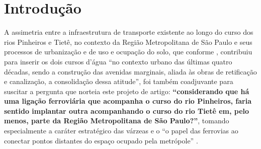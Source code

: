 \documentclass[
	12pt,				%
	openright,			%
	oneside,
	a4paper,			%
	english,			%
	french,				%
	spanish,			%
	brazil,				%
	]{abntex2}
\begin{document}
\tableofcontents*
\cleardoublepage


\textual

\chapter*[Introdução]{Introdução} \label{intro}



A assimetria entre a infraestrutura de transporte existente ao longo do curso dos rios Pinheiros e Tietê, no contexto da Região Metropolitana de São Paulo e seus processos de urbanização e de uso e ocupação do solo, que conforme , contribuiu para inserir os dois cursos d'água ``no contexto urbano das últimas quatro décadas, sendo a construção das avenidas marginais, aliada às obras de retificação e canalização, a consolidação dessa atitude'', foi também coadjuvante para suscitar a pergunta que norteia este projeto de artigo: \textbf{``considerando que há uma ligação ferroviária que acompanha o curso do rio Pinheiros, faria sentido implantar outra acompanhando o curso do rio Tietê em, pelo menos, parte da Região Metropolitana de São Paulo?''}, tomando especialmente a caráter estratégico das várzeas \cite[p.63]{franco2005a} e o ``o papel das ferrovias ao conectar pontos distantes do espaço ocupado pela metrópole'' \cite[p.63]{franco2005a}.
\end{document}

